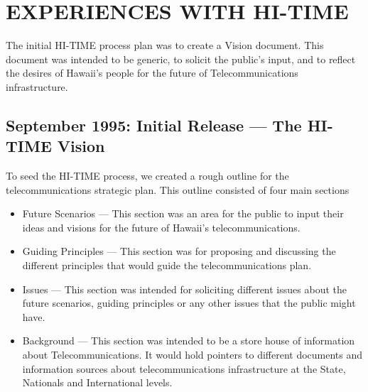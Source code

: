 
\section{EXPERIENCES WITH HI-TIME}

The initial HI-TIME process plan was to create a Vision document.  This
document was intended to be generic, to solicit the public's input, and to
reflect the desires of Hawaii's people for the future of Telecommunications
infrastructure.

\subsection{September 1995: Initial Release --- The HI-TIME Vision}

To seed the HI-TIME process, we created a rough outline for the
telecommunications strategic plan.  This outline consisted of four main
sections

\begin{itemize}
\item Future Scenarios --- This section was an area for the public to
  input their ideas and visions for the future of Hawaii's
  telecommunications.
\item Guiding Principles --- This section was for proposing and
  discussing the different principles that would guide the
  telecommunications plan.
\item Issues --- This section was intended for soliciting different issues
  about the future scenarios, guiding principles or any other issues that the
  public might have.
\item Background --- This section was intended to be a store house of
  information about Telecommunications.  It would hold pointers to different
  documents and information sources about telecommunications infrastructure
  at the State, Nationals and International levels.
\end{itemize}

